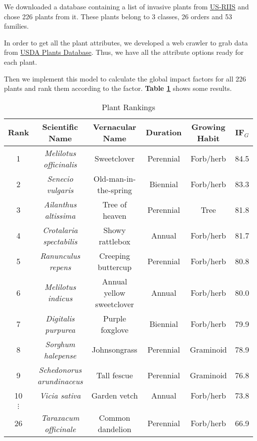 \documentclass[12pt]{article}
\begin{document}
		We downloaded a database containing a list of invasive plants from \href{https://www.sciencebase.gov/catalog/item/5b911a5ce4b0702d0e808588}{US-RIIS}\autocite{US-RIIS} and chose 226 plants from it.  These plants belong to 3 classes, 26 orders and 53 families.
		
		In order to get all the plant attributes, we developed a web crawler to grab data from \href{https://plants.usda.gov/home/}{USDA Plants Database}\autocite{USDA}.  Thus, we have all the attribute options ready for each plant.
		
		Then we implement this model to calculate the global impact factors for all 226 plants and rank them according to the factor.  \textbf{Table \ref{tb:ranks}} shows some results.
		
		{
			\fontsize{10}{14}\selectfont
			{
				\begin{longtable}{cccccc}
					\caption{Plant Rankings}
					\label{tb:ranks}\\
					
					\toprule
					Rank&Scientific Name&Vernacular Name&Duration&Growing Habit&IF$_G$\\
					\toprule
					1&\textit{Melilotus officinalis}&Sweetclover&Perennial&Forb/herb&84.5\\
					2&\textit{Senecio vulgaris}&Old-man-in-the-spring&Biennial&Forb/herb&83.3\\
					3&\textit{Ailanthus altissima}&Tree of heaven&Perennial&Tree&81.8\\
					4&\textit{Crotalaria spectabilis}&Showy rattlebox&Annual&Forb/herb&81.7\\
					5&\textit{Ranunculus repens}&Creeping buttercup&Perennial&Forb/herb&80.8\\
					6&\textit{Melilotus indicus}&Annual yellow sweetclover&Annual&Forb/herb&80.0\\
					7&\textit{Digitalis purpurea}&Purple foxglove&Biennial&Forb/herb&79.9\\
					8&\textit{Sorghum halepense}&Johnsongrass&Perennial&Graminoid&78.9\\
					9&\textit{Schedonorus arundinaceus}&Tall fescue&Perennial&Graminoid&76.8\\
					10&\textit{Vicia sativa}&Garden vetch&Annual&Forb/herb&73.8\\
					$\vdots$\\
					26&\textit{Taraxacum officinale}&Common dandelion&Perennial&Forb/herb&66.9\\
					\bottomrule
				\end{longtable}
			}
		}
		
\end{document}
